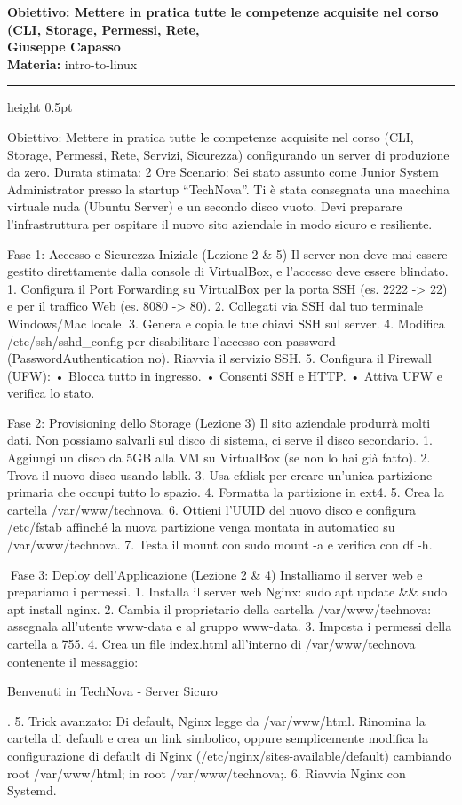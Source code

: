 \documentclass[11pt,a4paper]{article}
\newcommand{\proposaltitle}[1]{
    \begin{center}
        \vspace*{0.1cm}
        {\LARGE \bfseries \color{blue} #1} \\[1.5ex]
        {\large \textbf{Giuseppe Capasso}} \\[1ex]
                \small{
            \vspace{0.1cm}
            \textbf{Materia:} intro-to-linux\\
        }
            \end{center}
    \vspace{0.3cm}
    \hrule height 0.5pt
    \vspace{0.5cm}
}
\begin{document}
\proposaltitle{Obiettivo: Mettere in pratica tutte le competenze acquisite nel corso (CLI, Storage, Permessi, Rete,}

Obiettivo: Mettere in pratica tutte le competenze acquisite nel corso
(CLI, Storage, Permessi, Rete, Servizi, Sicurezza) configurando un
server di produzione da zero. Durata stimata: 2 Ore Scenario: Sei stato
assunto come Junior System Administrator presso la startup ``TechNova''.
Ti è stata consegnata una macchina virtuale nuda (Ubuntu Server) e un
secondo disco vuoto. Devi preparare l'infrastruttura per ospitare il
nuovo sito aziendale in modo sicuro e resiliente.

Fase 1: Accesso e Sicurezza Iniziale (Lezione 2 \& 5) Il server non deve
mai essere gestito direttamente dalla console di VirtualBox, e l'accesso
deve essere blindato. 1. Configura il Port Forwarding su VirtualBox per
la porta SSH (es. 2222 -\textgreater{} 22) e per il traffico Web (es.
8080 -\textgreater{} 80). 2. Collegati via SSH dal tuo terminale
Windows/Mac locale. 3. Genera e copia le tue chiavi SSH sul server. 4.
Modifica /etc/ssh/sshd\_config per disabilitare l'accesso con password
(PasswordAuthentication no). Riavvia il servizio SSH. 5. Configura il
Firewall (UFW): • Blocca tutto in ingresso. • Consenti SSH e HTTP. •
Attiva UFW e verifica lo stato.

Fase 2: Provisioning dello Storage (Lezione 3) Il sito aziendale
produrrà molti dati. Non possiamo salvarli sul disco di sistema, ci
serve il disco secondario. 1. Aggiungi un disco da 5GB alla VM su
VirtualBox (se non lo hai già fatto). 2. Trova il nuovo disco usando
lsblk. 3. Usa cfdisk per creare un'unica partizione primaria che occupi
tutto lo spazio. 4. Formatta la partizione in ext4. 5. Crea la cartella
/var/www/technova. 6. Ottieni l'UUID del nuovo disco e configura
/etc/fstab affinché la nuova partizione venga montata in automatico su
/var/www/technova. 7. Testa il mount con sudo mount -a e verifica con df
-h.

Fase 3: Deploy dell'Applicazione (Lezione 2 \& 4) Installiamo il server
web e prepariamo i permessi. 1. Installa il server web Nginx: sudo apt
update \&\& sudo apt install nginx. 2. Cambia il proprietario della
cartella /var/www/technova: assegnala all'utente www-data e al gruppo
www-data. 3. Imposta i permessi della cartella a 755. 4. Crea un file
index.html all'interno di /var/www/technova contenente il messaggio:

Benvenuti in TechNova - Server Sicuro

. 5. Trick avanzato: Di default, Nginx legge da /var/www/html. Rinomina
la cartella di default e crea un link simbolico, oppure semplicemente
modifica la configurazione di default di Nginx
(/etc/nginx/sites-available/default) cambiando root /var/www/html; in
root /var/www/technova;. 6. Riavvia Nginx con Systemd.
\end{document}
